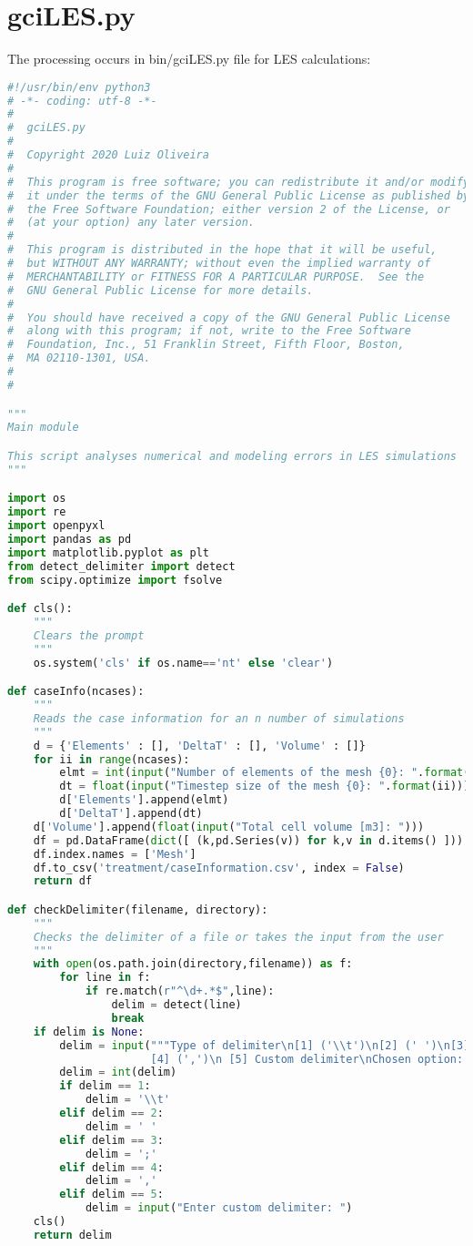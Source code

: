\section{gciLES.py}
The processing occurs in bin/gciLES.py file for LES calculations:
\begin{lstlisting}[language=python]
#!/usr/bin/env python3
# -*- coding: utf-8 -*-
#
#  gciLES.py
#  
#  Copyright 2020 Luiz Oliveira
#  
#  This program is free software; you can redistribute it and/or modify
#  it under the terms of the GNU General Public License as published by
#  the Free Software Foundation; either version 2 of the License, or
#  (at your option) any later version.
#  
#  This program is distributed in the hope that it will be useful,
#  but WITHOUT ANY WARRANTY; without even the implied warranty of
#  MERCHANTABILITY or FITNESS FOR A PARTICULAR PURPOSE.  See the
#  GNU General Public License for more details.
#  
#  You should have received a copy of the GNU General Public License
#  along with this program; if not, write to the Free Software
#  Foundation, Inc., 51 Franklin Street, Fifth Floor, Boston,
#  MA 02110-1301, USA.
#  
#  

"""
Main module

This script analyses numerical and modeling errors in LES simulations
"""

import os
import re
import openpyxl
import pandas as pd
import matplotlib.pyplot as plt
from detect_delimiter import detect
from scipy.optimize import fsolve

def cls():
    """
    Clears the prompt
    """
    os.system('cls' if os.name=='nt' else 'clear')

def caseInfo(ncases):
    """
    Reads the case information for an n number of simulations
    """
    d = {'Elements' : [], 'DeltaT' : [], 'Volume' : []}
    for ii in range(ncases):
        elmt = int(input("Number of elements of the mesh {0}: ".format(ii)))
        dt = float(input("Timestep size of the mesh {0}: ".format(ii)))
        d['Elements'].append(elmt)
        d['DeltaT'].append(dt)
    d['Volume'].append(float(input("Total cell volume [m3]: ")))
    df = pd.DataFrame(dict([ (k,pd.Series(v)) for k,v in d.items() ]))
    df.index.names = ['Mesh']
    df.to_csv('treatment/caseInformation.csv', index = False)
    return df

def checkDelimiter(filename, directory):
    """
    Checks the delimiter of a file or takes the input from the user
    """
    with open(os.path.join(directory,filename)) as f:
        for line in f:
            if re.match(r"^\d+.*$",line):
                delim = detect(line)
                break
    if delim is None:
        delim = input("""Type of delimiter\n[1] ('\\t')\n[2] (' ')\n[3] (';')
                      [4] (',')\n [5] Custom delimiter\nChosen option: """)
        delim = int(delim)
        if delim == 1:
            delim = '\\t'
        elif delim == 2:
            delim = ' '
        elif delim == 3:
            delim = ';'
        elif delim == 4:
            delim = ','
        elif delim == 5:
            delim = input("Enter custom delimiter: ")
    cls()
    return delim


\end{lstlisting}
